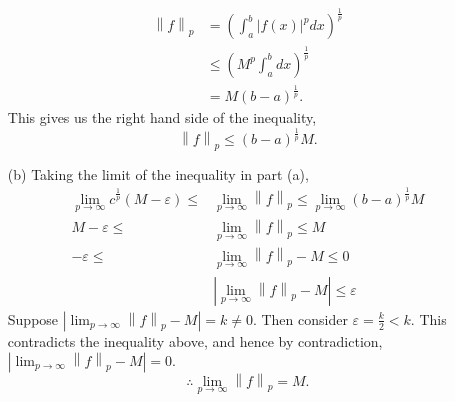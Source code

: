 \documentclass[a4paper]{article}
\newcommand{\norm}[1]{\left\lVert#1\right\rVert}
\begin{document}
\begin{enumerate}[leftmargin=\labelsep]
		\begin{align*}
			\norm{f}_p & = \left(\int_a^b |f(x)|^p dx\right)^{\frac{1}{p}} \\
			& \leq \left(M^p \int_a^b dx\right)^{\frac{1}{p}} \\
			& = M(b - a)^{\frac{1}{p}}.
		\end{align*}
		This gives us the right hand side of the inequality,
		$$\norm{f}_p \leq (b - a)^{\frac{1}{p}}M.$$
	\item[(b)]
		Taking the limit of the inequality in part (a),
		\begin{align*}
			\lim_{p \rightarrow \infty} c^{\frac{1}{p}} (M - \varepsilon) \leq & \lim_{p \rightarrow \infty} \norm{f}_p \leq \lim_{p \rightarrow \infty} (b - a)^{\frac{1}{p}} M \\
			M - \varepsilon \leq & \lim_{p \rightarrow \infty} \norm{f}_p \leq M \\
			- \varepsilon \leq & \lim_{p \rightarrow \infty} \norm{f}_p - M \leq 0 \\
			& \left|\lim_{p \rightarrow \infty} \norm{f}_p - M\right| \leq \varepsilon
		\end{align*}
		Suppose $\displaystyle \left|\lim_{p \rightarrow \infty} \norm{f}_p - M\right| = k \neq 0$. Then consider $\varepsilon = \frac{k}{2} < k$. This contradicts the inequality above, and hence by contradiction, $\displaystyle \left|\lim_{p \rightarrow \infty} \norm{f}_p - M\right| = 0.$
		$$\therefore \lim_{p \rightarrow \infty} \norm{f}_p = M.$$



\end{enumerate}
\end{document}
